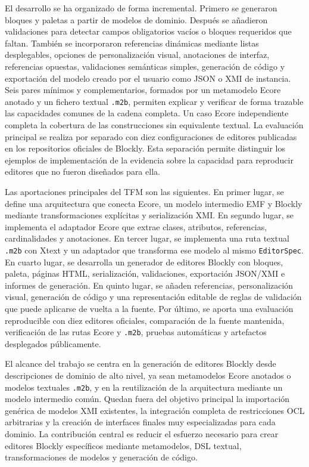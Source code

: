 El desarrollo se ha organizado de forma incremental. Primero se generaron bloques
y paletas a partir de modelos de dominio. Después se añadieron validaciones para
detectar campos obligatorios vacíos o bloques requeridos que faltan. También se
incorporaron referencias dinámicas mediante listas desplegables, opciones de
personalización visual, anotaciones de interfaz, referencias opuestas,
validaciones semánticas simples, generación de código y exportación del modelo
creado por el usuario como JSON o XMI de instancia. Seis pares mínimos y
complementarios, formados por un metamodelo Ecore anotado y un fichero textual
\texttt{.m2b}, permiten explicar y verificar de forma trazable las capacidades
comunes de la cadena completa. Un caso Ecore independiente completa la cobertura
de las construcciones sin equivalente textual. La evaluación principal se
realiza por separado con diez configuraciones de editores
publicadas en los repositorios oficiales de Blockly. Esta separación permite
distinguir los ejemplos de implementación de la evidencia sobre la
capacidad para reproducir editores que no fueron diseñados para ella.

Las aportaciones principales del TFM son las siguientes. En primer lugar, se
define una arquitectura que conecta Ecore, un modelo intermedio EMF y Blockly
mediante transformaciones explícitas y serialización XMI. En segundo lugar, se
implementa el adaptador Ecore que extrae clases, atributos, referencias,
cardinalidades y anotaciones. En tercer lugar, se implementa una ruta textual
\texttt{.m2b} con Xtext y un adaptador que transforma ese modelo al mismo
\texttt{EditorSpec}. En cuarto lugar, se desarrolla un generador de editores
Blockly con bloques, paleta, páginas HTML, serialización, validaciones,
exportación JSON/XMI e informes de generación. En quinto lugar, se añaden
referencias, personalización visual, generación de código y una representación
editable de reglas de validación que puede aplicarse de vuelta a la fuente. Por
último, se aporta una evaluación reproducible con diez editores oficiales,
comparación de la fuente mantenida, verificación de las rutas Ecore y
\texttt{.m2b}, pruebas automáticas y artefactos desplegados públicamente.

El alcance del trabajo se centra en la generación de editores Blockly desde
descripciones de dominio de alto nivel, ya sean metamodelos Ecore anotados o
modelos textuales \texttt{.m2b}, y en la reutilización de la arquitectura
mediante un modelo intermedio común. Quedan fuera del objetivo principal la importación
genérica de modelos XMI existentes, la integración completa de restricciones OCL
arbitrarias y la creación de interfaces finales muy especializadas para cada
dominio. La contribución central es reducir el esfuerzo necesario para crear
editores Blockly específicos mediante metamodelos, DSL textual, transformaciones
de modelos y generación de código.

